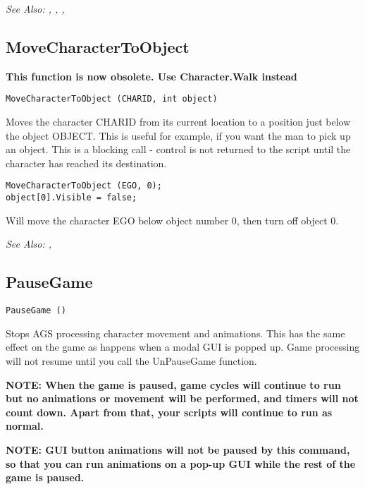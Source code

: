 \it{See Also:} , ,
, 


\subsection{MoveCharacterToObject}\label{MoveCharacterToObject}%

\bf{This function is now obsolete. Use Character.Walk instead}

\begin{verbatim}
MoveCharacterToObject (CHARID, int object)
\end{verbatim}
Moves the character CHARID from its current location to a position just below
the object OBJECT. This is useful for example, if you want the man to pick
up an object.
This is a blocking call - control is not returned to the script until the
character has reached its destination.

\begin{verbatim}
MoveCharacterToObject (EGO, 0);
object[0].Visible = false;
\end{verbatim}
Will move the character EGO below object number 0, then turn off object 0.

\it{See Also:} ,



\subsection{PauseGame}\label{PauseGame}%

\begin{verbatim}
PauseGame ()
\end{verbatim}
Stops AGS processing character movement and animations. This has the same
effect on the game as happens when a modal GUI is popped up. Game processing
will not resume until you call the UnPauseGame function.

\bf{NOTE:} When the game is paused, game cycles will continue to run but
no animations or movement will be performed, and timers will not count down. Apart
from that, your scripts will continue to run as normal.

\bf{NOTE:} GUI button animations will not be paused by this command, so that
you can run animations on a pop-up GUI while the rest of the game is paused.

